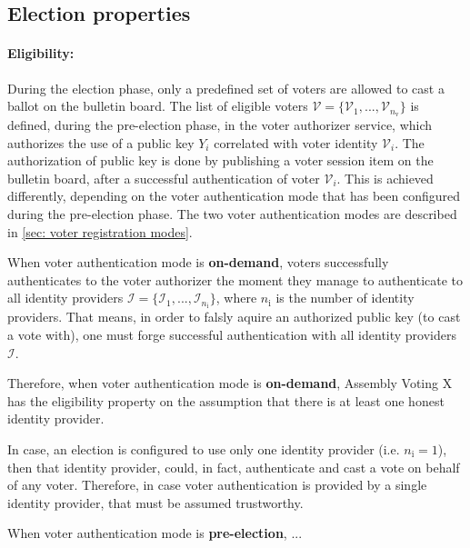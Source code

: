 \subsection{Election properties} \label{sec: election properties}


\paragraph{Eligibility:}
During the election phase, only a predefined set of voters are allowed to cast a ballot on the bulletin board. The list of eligible voters $\boldsymbol{\mathcal{V}} = \{ \mathcal{V}_1, ..., \mathcal{V}_{n_\mathrm{v}} \}$ is defined, during the pre-election phase, in the voter authorizer service, which authorizes the use of a public key $Y_i$ correlated with voter identity $\mathcal{V}_i$. The authorization of public key is done by publishing a voter session item on the bulletin board, after a successful authentication of voter $\mathcal{V}_i$. This is achieved differently, depending on the voter authentication mode that has been configured during the pre-election phase. The two voter authentication modes are described in \cref{sec: voter registration modes}.

When voter authentication mode is \textbf{on-demand}, voters successfully authenticates to the voter authorizer the moment they manage to authenticate to all identity providers $\boldsymbol{\mathcal{I}} = \{ \mathcal{I}_1, ..., \mathcal{I}_{n_\mathrm{i}} \}$, where $n_\mathrm{i}$ is the number of identity providers. That means, in order to falsly aquire an authorized public key (to cast a vote with), one must forge successful authentication with all identity providers $\boldsymbol{\mathcal{I}}$.

Therefore, when voter authentication mode is \textbf{on-demand}, Assembly Voting X has the eligibility property on the assumption that there is at least one honest identity provider.

In case, an election is configured to use only one identity provider (i.e. $n_\mathrm{i} = 1$), then that identity provider, could, in fact, authenticate and cast a vote on behalf of any voter. Therefore, in case voter authentication is provided by a single identity provider, that must be assumed trustworthy.

When voter authentication mode is \textbf{pre-election}, ...


